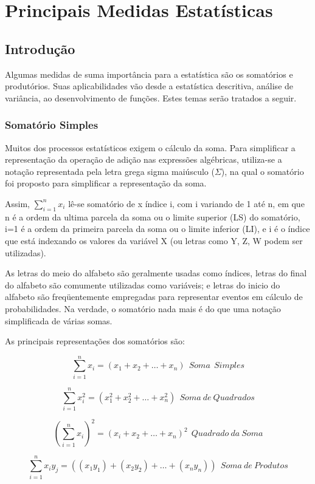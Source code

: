 \chapter{Principais Medidas Estatísticas}
\section{Introdução}

Algumas medidas de suma importância para a estatística são os somatórios e produtórios. Suas aplicabilidades vão desde a estatística descritiva, análise de variância, ao desenvolvimento de funções. Estes temas serão tratados a seguir.

\subsection{Somatório Simples}

Muitos dos processos estatísticos exigem o cálculo da soma. Para simplificar a representação da operação de adição nas expressões algébricas, utiliza-se a notação representada pela letra grega sigma maiúsculo ($\Sigma$), na qual o somatório foi proposto para simplificar a representação da soma.\vskip0.3cm


Assim, $\sum_{i=1}^{n}x_{i}$  lê-se  somatório de x índice i, com i variando de 1 até n, em que n é a ordem da ultima parcela da soma ou o limite superior (LS) do somatório, i=1 é a ordem da primeira parcela da soma ou o limite inferior (LI), e i é o índice que está indexando os valores da variável  X (ou letras como Y, Z, W podem ser utilizadas).\vskip0.3cm

As letras do meio do alfabeto são geralmente usadas como índices, letras do final do alfabeto são comumente utilizadas como variáveis; e letras do inicio do alfabeto são freqüentemente empregadas para representar eventos em cálculo de probabilidades. Na verdade, o somatório nada mais é do que uma notação simplificada de várias somas.\vskip0.3cm

As principais representações dos somatórios são:


$$\sum_{i=1}^{n}x_{i} = (x_{1}+x_{2}+\ldots+x_{n}) \ \ Soma \ \ Simples $$

$$\sum_{i=1}^{n}x_{i}^{2} = (x_{1}^{2}+x_{2}^{2}+\ldots+x_{n}^{2}) \ \ Soma \ de \ Quadrados$$


$$ \left(\sum_{i=1}^{n}x_{i}\right)^{2}=(x_{i}+x_{2}+\ldots+x_{n})^{2} \ \ Quadrado \ da \ Soma$$

$$ \sum_{i=1}^{n}x_{i}y_{j}= \left( (x_{1}y_{1})+(x_{2}y_{2})+\ldots+(x_{n}y_{n}) \right) \ \ Soma \ de \ Produtos$$

